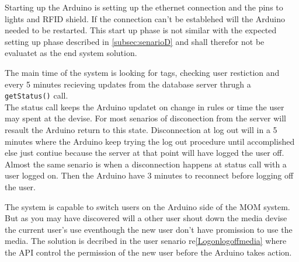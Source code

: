 Starting up the Arduino is setting up the ethernet connection and the pins to lights and RFID shield. If the connection can't be establehed will the Arduino needed to be restarted. This start up phase is not similar with the expected setting up phase described in \ref{subsec:senarioD} and shall therefor not be evaluatet as the end system solution.

The main time of the system is looking for tags, checking user restiction and every 5 minutes recieving updates from the database server thrugh a \verb|getStatus()| call. \\
The status call keeps the Arduino updatet on change in rules or time the user may spent at the devise.      
For most senarios of disconection from the server will resault the Arduino return to this state. 
Disconnection at log out will in a 5 minutes where the Arduino keep trying the log out procedure until accomplished else just contiue because the server at that point will have logged the user off.
Almost the same senario is when a disconnection happens at status call with a user logged on. Then the Arduino have 3 minutes to reconnect before logging off the user. 

The system is capable to switch users on the Arduino side of the MOM system. But as you may have discovered will a other user shout down the media devise the current user's use eventhough the new user don't have promission to use the media. The solution is decribed in the user senario re\ref{Logonlogoffmedia} where the API control the permission of the new user before the Arduino takes action.       
